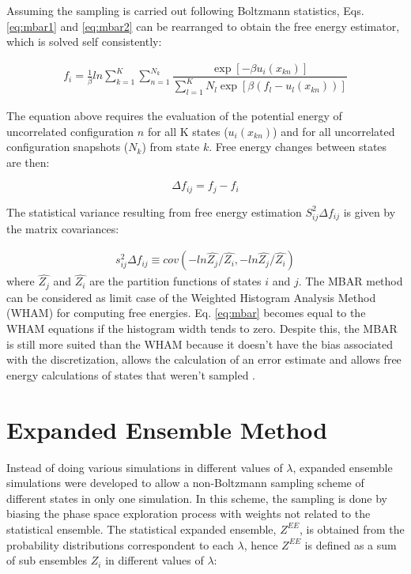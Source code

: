 Assuming the sampling is carried out following Boltzmann statistics, Eqs. \eqref{eq:mbar1} and \eqref{eq:mbar2} can be rearranged to obtain the free energy estimator, which is solved self consistently:  

\begin{equation}
\label{eq:mbar}
\begin{aligned}
f_{i} = \frac{1}{\beta}ln \sum_{k=1}^{K} \sum_{n=1}^{N_{k}}
\dfrac{\exp[-\beta u_{i}(x_{kn})]}{\sum_{l=1}^{K} N_{l} \exp[\beta (f_{l} - u_{l}(x_{kn}))]}
\end{aligned}
\end{equation}

The equation above requires the evaluation of the potential energy  of uncorrelated configuration $n$ for all K states ($u_{i}(x_{kn})$) and for all uncorrelated configuration snapshots ($N_{k}$) from state $k$. Free energy changes between states are then:

\begin{equation}
\Delta f_{ij} = f_{j} -  f_{i} 
\end{equation} 

The statistical variance resulting from free energy estimation $S_{ij}^{2} \Delta f_{ij}$ is given by the matrix covariances:

\begin{equation}
\label{eq:varmbar}
\begin{aligned}
s_{ij}^{2} \Delta f_{ij} \equiv cov (-ln \hat{Z_{j}}/\hat{Z_{i}},-ln \hat{Z_{j}}/\hat{Z_{i}})
\end{aligned}
\end{equation}
where $\hat{Z_{j}}$ and $\hat{Z_{i}}$ are the partition functions of states $i$ and $j$. The MBAR method can be considered as limit case of the 
Weighted Histogram Analysis Method (WHAM) \cite{wham} for computing free energies. Eq. \eqref{eq:mbar} becomes equal to the WHAM equations if the histogram width tends to zero. Despite this, the MBAR is still more suited than the WHAM because it doesn't have the bias associated with the discretization, allows the calculation of an error estimate and allows free energy calculations of states that weren't sampled \cite{mbar}.

\section{Expanded Ensemble Method}\label{ee}

Instead of doing various simulations in different values of $\lambda$, expanded ensemble simulations \cite{lyubartsev} were developed to allow a non-Boltzmann sampling scheme of different states in only one simulation. In this scheme, the sampling is done by biasing the phase space exploration process with weights not related to the statistical ensemble. The statistical expanded ensemble, $Z^{EE}$, is obtained from the probability distributions correspondent to each $\lambda$, hence $Z^{EE}$ is defined as a sum of sub ensembles $Z_{i}$ in different values of $\lambda$:

